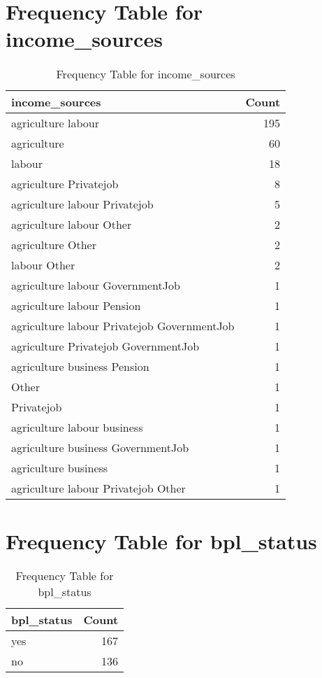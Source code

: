 \documentclass{article}
\begin{document}
\section{Frequency Table for income_sources}
\begin{table}
\caption{Frequency Table for income_sources}
\label{tab:income_sources_freq}
\begin{tabular}{lr}
\toprule
income\_sources & Count \\
\midrule
agriculture labour & 195 \\
agriculture & 60 \\
labour & 18 \\
agriculture Privatejob & 8 \\
agriculture labour Privatejob & 5 \\
agriculture labour Other & 2 \\
agriculture Other & 2 \\
labour Other & 2 \\
agriculture labour GovernmentJob & 1 \\
agriculture labour Pension & 1 \\
agriculture labour Privatejob GovernmentJob & 1 \\
agriculture Privatejob GovernmentJob & 1 \\
agriculture business Pension & 1 \\
Other & 1 \\
Privatejob & 1 \\
agriculture labour business & 1 \\
agriculture business GovernmentJob & 1 \\
agriculture business & 1 \\
agriculture labour Privatejob Other & 1 \\
\bottomrule
\end{tabular}
\end{table}

\section{Frequency Table for bpl_status}
\begin{table}
\caption{Frequency Table for bpl_status}
\label{tab:bpl_status_freq}
\begin{tabular}{lr}
\toprule
bpl\_status & Count \\
\midrule
yes & 167 \\
no & 136 \\
\bottomrule
\end{tabular}
\end{table}
\end{document}
